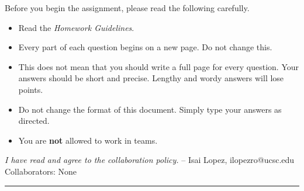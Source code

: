 \documentclass[11pt]{article}
\begin{document}
\renewcommand{\P}{\mbox{IH}}
Before you begin the assignment, please read the following carefully.
\begin{itemize}
    \item Read the \emph{Homework Guidelines}.
    \item Every part of each question begins on a new page. Do not change this.
    \item This does not mean that you should write a full page for every question. Your answers should be short and precise. Lengthy and wordy answers will lose points.
    \item Do not change the format of this document. Simply type your answers as directed.
    \item You are \textbf{not} allowed to work in teams.
\end{itemize}
\emph{I have read and agree to the collaboration policy.}  -- Isai Lopez, ilopezro@ucsc.edu
\\
Collaborators: None%
\\
\hrule
\end{document}
